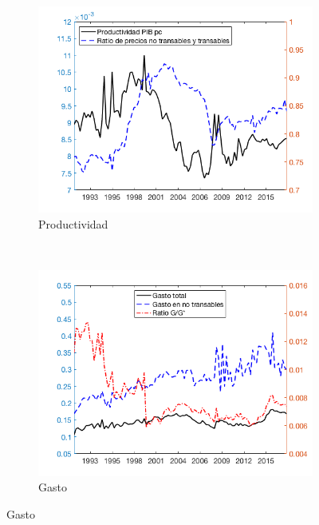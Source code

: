 \documentclass{beamer}
\begin{document}
\begin{frame}
\begin{figure}
\captionsetup[subfigure]{font=scriptsize,labelfont=scriptsize}
\centering
    \begin{subfigure}[b]{0.4\textwidth}
       \includegraphics[width=\textwidth]{fig11}
        \caption{\tiny Productividad}
    \end{subfigure}
    ~ %
    \begin{subfigure}[b]{0.4\textwidth}
        \includegraphics[width=\textwidth]{fig12}
        \caption{\tiny Gasto}
    \end{subfigure}

\end{figure}
\end{frame}
\end{document}
